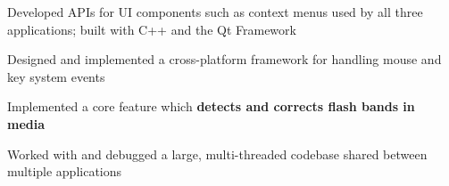 \begin{cventries}
{\begin{cvitems}
        \item Developed APIs for UI components such as context menus used by all three applications; built with C++ and the Qt Framework
        \item Designed and implemented a cross-platform framework for handling mouse and key system events
        \item Implemented a core feature which \textbf{detects and corrects flash bands in media}
        \item Worked with and debugged a large, multi-threaded codebase shared between multiple applications
      \end{cvitems}
    }
\end{cventries}

